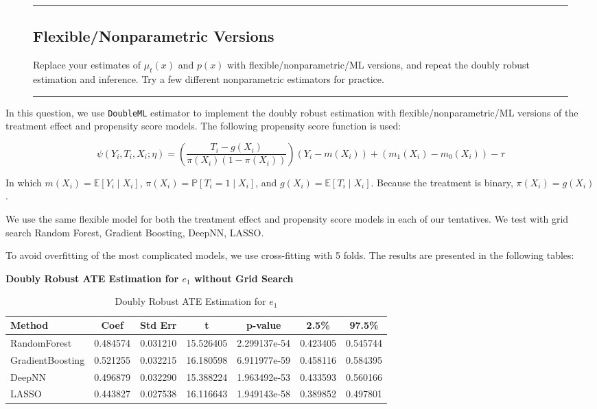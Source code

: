 \documentclass{article}
\newenvironment{colorparagraph}[1]{\par\color{#1}}{\par}
\begin{document}
\begin{figure}[H]
  \begin{colorparagraph}{questioncolor}
  \rule{\textwidth}{0.5pt}
  \label{q3d}
  \subsection{Flexible/Nonparametric Versions}

  Replace your estimates of \( \mu_t(x) \) and \( p(x) \) with flexible/nonparametric/ML versions, and repeat the doubly robust estimation and inference. Try a few different nonparametric estimators for practice.

  \rule{\textwidth}{0.5pt}
  \end{colorparagraph}
\end{figure}

In this question, we use \texttt{DoubleML} estimator to implement the doubly robust estimation with flexible/nonparametric/ML versions of the treatment effect and propensity score models. The following propensity score function is used:

$$
\psi(Y_i, T_i, X_i; \eta) = \left( \frac{T_i - g(X_i)}{\pi(X_i)(1 - \pi(X_i))} \right) (Y_i - m(X_i)) + \left( m_1(X_i) - m_0(X_i) \right) - \tau
$$

In which $m(X_i) = \mathbb{E}[Y_i \mid X_i]$, $\pi(X_i) = \mathbb{P}[T_i = 1 \mid X_i]$, and $g(X_i) = \mathbb{E}[T_i \mid X_i]$. Because the treatment is binary, $\pi(X_i) = g(X_i)$.

We use the same flexible model for both the treatment effect and propensity score models in each of our tentatives. We test with grid search Random Forest, Gradient Boosting, DeepNN, LASSO.

To avoid overfitting of the most complicated models, we use cross-fitting with 5 folds. The results are presented in the following tables:

\textbf{Doubly Robust ATE Estimation for $e_1$ without Grid Search}

\begin{table}[H]
  \centering
  \renewcommand{\arraystretch}{1.5}
  \begin{tabular}{|l|c|c|c|c|c|c|}
    \hline
    \textbf{Method} & \textbf{Coef} & \textbf{Std Err} & \textbf{t} & \textbf{p-value} & \textbf{2.5\%} & \textbf{97.5\%} \\
    \hline
    RandomForest & 0.484574 & 0.031210 & 15.526405 & 2.299137e-54 & 0.423405 & 0.545744 \\ \hline
    GradientBoosting & 0.521255 & 0.032215 & 16.180598 & 6.911977e-59 & 0.458116 & 0.584395 \\ \hline
    DeepNN & 0.496879 & 0.032290 & 15.388224 & 1.963492e-53 & 0.433593 & 0.560166 \\ \hline
    LASSO & 0.443827 & 0.027538 & 16.116643 & 1.949143e-58 & 0.389852 & 0.497801 \\ \hline
  \end{tabular}
  \caption{Doubly Robust ATE Estimation for $e_1$}
\end{table}
\end{document}
